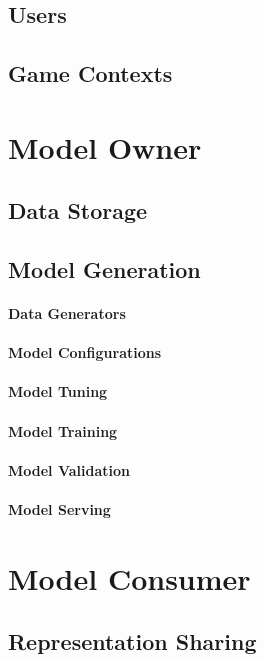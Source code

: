 \subsection{Users}
\lorem
\subsection{Game Contexts}
\lorem

\section{Model Owner}
\lorem
\subsection{Data Storage}
\lorem
\subsection{Model Generation}
\lorem
\paragraph*{Data Generators} \lorem
\paragraph*{Model Configurations} \lorem
\paragraph*{Model Tuning} \lorem
\paragraph*{Model Training} \lorem
\paragraph*{Model Validation} \lorem
\paragraph*{Model Serving} \lorem

\section{Model Consumer}
\lorem
\subsection{Representation Sharing}
\lorem

